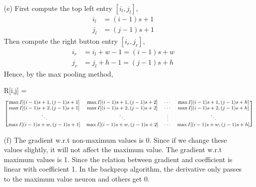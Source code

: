 \documentclass[a4paper,12pt]{article}
\begin{document}
\begin{enumerate}
\clearpage
\item[(e)]
First compute the top left entry $[i_l,j_l]$, 
\begin{align*}
i_l &= (i-1)s+1 \\
j_l &= (j-1)s+1
\end{align*}
Then compute the right button entry $[i_r,j_r]$,
\begin{align*}
i_r &= i_l + w -1 = (i-1)s+w\\
j_r &= j_l + h -1 = (j-1)s + h
\end{align*}
Hence,  by the max pooling method,

R[i,j] = 
$$\footnotesize \begin{bmatrix} 
\max I[(i-1)s+1,(j-1)s+1] & \max I[(i-1)s+1,(j-1)s+2] & \cdots & \max I[(i-1)s+1,(j-1)s+h] \\
\max I[(i-1)s+2,(j-1)s+1] & \max I[(i-1)s+2,(j-1)s+2] & \cdots & \max I[(i-1)s+2,(j-1)s+h] \\
\ddots & \ddots & \vdots & \ddots \\
\max I[(i-1)s+w,(j-1)s+1] & \max I[(i-1)s+w,(j-1)s+2] & \cdots & \max I[(i-1)s+w,(j-1)s+h] \\
\end{bmatrix}$$

\clearpage
\item[(f)]
The gradient w.r.t non-maximum values is 0. Since if we change these values slightly, it will not affect the maximum value. The gradient w.r.t maximum values is 1. Since the relation between gradient and coefficient is linear with coefficient 1. In the backprop algorithm, the derivative only passes to the maximum value neuron and others get 0.

\end{enumerate}
\end{document}
